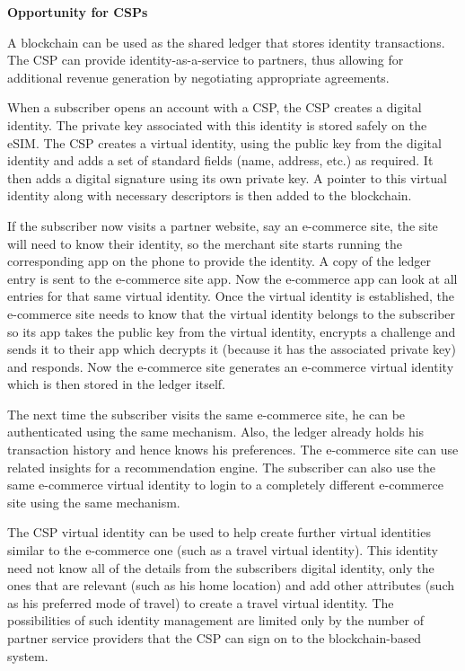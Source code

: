 \documentclass[12pt]{article}
\begin{document}
\textbf{Opportunity for CSPs}

A blockchain can be used as the shared
ledger that stores identity transactions. The
CSP can provide identity-as-a-service to
partners, thus allowing for additional revenue
generation by negotiating appropriate
agreements.

When a subscriber opens an account with a
CSP, the CSP creates a digital identity. The
private key associated with this identity is
stored safely on the eSIM. The CSP creates
a virtual identity, using the public key from
the digital identity and adds a set of standard
fields (name, address, etc.) as required.
It then adds a digital signature using its
own private key. A pointer to this virtual
identity along with necessary descriptors is
then added to the blockchain.

If the subscriber now visits a partner
website, say an e-commerce site, the site
will need to know their identity, so the
merchant site starts running the corresponding
app on the phone to provide
the identity. A copy of the ledger entry is
sent to the e-commerce site app. Now the
e-commerce app can look at all entries for
that same virtual identity. Once the virtual
identity is established, the e-commerce
site needs to know that the virtual identity
belongs to the subscriber so its app takes
the public key from the virtual identity,
encrypts a challenge and sends it to their
app which decrypts it (because it has the
associated private key) and responds. Now
the e-commerce site generates an e-commerce
virtual identity which is then stored
in the ledger itself.

The next time the subscriber visits the
same e-commerce site, he can be authenticated
using the same mechanism. Also, the
ledger already holds his transaction history
and hence knows his preferences. The
e-commerce site can use related insights
for a recommendation engine. The subscriber
can also use the same e-commerce
virtual identity to login to a completely
different e-commerce site using the same
mechanism.

The CSP virtual identity can be used to help
create further virtual identities similar to the
e-commerce one (such as a travel virtual
identity). This identity need not know all
of the details from the subscribers digital
identity, only the ones that are relevant
(such as his home location) and add other
attributes (such as his preferred mode of
travel) to create a travel virtual identity. The
possibilities of such identity management
are limited only by the number of partner
service providers that the CSP can sign on
to the blockchain-based system.
\end{document}
